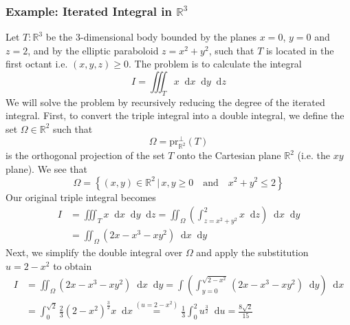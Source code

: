 \documentclass[11pt, a4paper]{article}
\newcommand{\diff}{\mathop{}\!\mathrm{d}} %
\begin{document}
\subsubsection{Example: Iterated Integral in $ \mathbb{R}^3 $}
Let $ T: \mathbb{R}^3 $ be the 3-dimensional body bounded by the planes $ x = 0 $, $ y = 0 $ and $ z = 2 $, and by the elliptic paraboloid $ z = x^2 + y^2 $, such that $ T $ is located in the first octant i.e. $ (x, y, z) \geq 0 $. The problem is to calculate the integral
\begin{equation*}
	I = \iiint_T x \diff x \diff y \diff z
\end{equation*}
We will solve the problem by recursively reducing the degree of the iterated integral. First, to convert the triple integral into a double integral, we define the set $ \Omega \in \mathbb{R}^2 $ such that 
\begin{equation*}
	\Omega = \text{pr}_{\mathbb{R}^2}^{\perp}(T)
\end{equation*}
is the orthogonal projection of the set $ T $ onto the Cartesian plane $ \mathbb{R}^2 $ (i.e. the $ xy $ plane). We see that 
\begin{equation*}
	\Omega = \left\{(x, y) \in \mathbb{R}^2 \, | \, x, y \geq 0 \quad \text{and} \quad x^2 + y^2 \leq 2  \right\}
\end{equation*}
Our original triple integral becomes
\begin{align*}
	I &= \iiint_T x \diff x \diff y \diff z = \iint_{\Omega} \left(\int_{z = x^2 + y^2}^{2} x \diff z\right) \diff x \diff y\\[1.5ex]
	&= \iint_{\Omega} \left(2x - x^3 - xy^2\right) \diff x \diff y
\end{align*}
Next, we simplify the double integral over $ \Omega $ and apply the substitution $ u = 2 - x^2 $ to obtain
\begin{align*}
	I &= \iint_{\Omega} \left(2x - x^3 - xy^2\right) \diff x \diff y = \int\left( \int_{y = 0}^{\sqrt{2 - x^2}} \left(2x - x^3 - xy^2\right) \diff y\right) \diff x\\[1.5ex]
	&=\int_{0}^{\sqrt{2}}  \frac{2}{3}(2-x^2)^{\frac{3}{2}} x \diff x \stackrel{\left(u = 2-x^2\right)}{=} \frac{1}{3}\int_{0}^{2} u^{\frac{3}{2}} \diff u = \frac{8\sqrt{2}}{15}
\end{align*}
\end{document}
